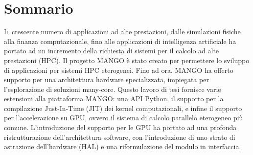 \chapter*{Sommario}
\lettrine{I}{l} crescente numero di applicazioni ad alte prestazioni, dalle simulazioni fisiche alla finanza computazionale, fino alle applicazioni di intelligenza artificiale ha portato ad un incremento della richiesta di sistemi per il calcolo ad alte prestazioni (HPC). Il progetto MANGO è stato creato per permettere lo sviluppo di applicazioni per sistemi HPC eterogenei. Fino ad ora, MANGO ha offerto supporto per una architettura hardware specializzata, impiegata per l'esplorazione di soluzioni many-core. Questo lavoro di tesi fornisce varie estensioni alla piattaforma MANGO: una API Python, il supporto per la compilazione Just-In-Time (JIT) dei kernel computazionali, e infine il supporto per l'accelerazione su GPU, ovvero il sistema di calcolo parallelo eterogeneo più comune. L'introduzione del supporto per le GPU ha portato ad una profonda ristrutturazione dell'architettura software, con l'introduzione di uno strato di astrazione dell'hardware (HAL) e una riformulazione del modulo in interfaccia.